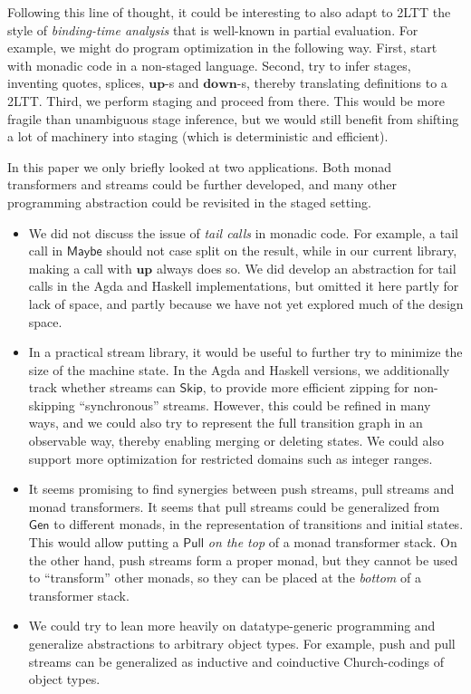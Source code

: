 \documentclass[acmsmall,screen,review,anonymous]{acmart}
\newcommand{\msf}[1]{{\mathsf{#1}}}
\newcommand{\mbf}[1]{{\mathbf{#1}}}
\newcommand{\Maybe}{\msf{Maybe}}
\theoremstyle{remark}
\newcommand{\mup}{\mbf{up}}
\newcommand{\mdown}{\mbf{down}}
\newcommand{\Gen}{\msf{Gen}}
\newcommand{\Skip}{\msf{Skip}}
\newcommand{\Pull}{\msf{Pull}}
\begin{document}
Following this line of thought, it could be interesting to also adapt to 2LTT
the style of \emph{binding-time analysis} that is well-known in partial
evaluation. For example, we might do program optimization in the following way.
First, start with monadic code in a non-staged language. Second, try to infer
stages, inventing quotes, splices, $\mup$-s and $\mdown$-s, thereby translating
definitions to a 2LTT. Third, we perform staging and proceed from there. This would
be more fragile than unambiguous stage inference, but we would still benefit from
shifting a lot of machinery into staging (which is deterministic and efficient).

In this paper we only briefly looked at two applications. Both monad
transformers and streams could be further developed, and many other programming
abstraction could be revisited in the staged setting.
\begin{itemize}
\item
     We did not discuss the issue of \emph{tail calls} in monadic code. For
     example, a tail call in $\Maybe$ should not case split on the result, while
     in our current library, making a call with $\mup$ always does so. We did
     develop an abstraction for tail calls in the Agda and Haskell
     implementations, but omitted it here partly for lack of space, and partly
     because we have not yet explored much of the design space.

\item In a practical stream library, it would be useful to further try to
     minimize the size of the machine state. In the Agda and Haskell versions, we
     additionally track whether streams can $\Skip$, to provide more efficient
     zipping for non-skipping ``synchronous'' streams. However, this could be
     refined in many ways, and we could also try to represent the full transition
     graph in an observable way, thereby enabling merging or deleting states.  We
     could also support more optimization for restricted domains such as integer
     ranges.

\item It seems promising to find synergies between push streams, pull streams
     and monad transformers. It seems that pull streams could be generalized from
     $\Gen$ to different monads, in the representation of transitions and initial
     states. This would allow putting a $\Pull$ \emph{on the top} of a monad
     transformer stack. On the other hand, push streams form a proper monad, but
     they cannot be used to ``transform'' other monads, so they can be placed
     at the \emph{bottom} of a transformer stack.
\item We could try to lean more heavily on datatype-generic programming and
     generalize abstractions to arbitrary object types. For example, push and pull
     streams can be generalized as inductive and coinductive Church-codings of
     object types.
\end{itemize}
\end{document}
